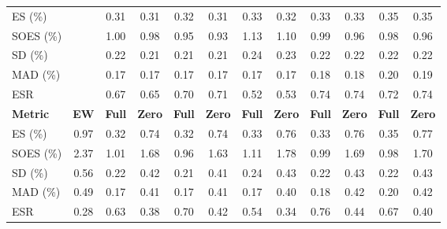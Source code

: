 \begin{tabular}{l*{11}{c}}
    \midrule
    ES (\%) &  & 0.31 & 0.31 & 0.32 & 0.31 & 0.33 & 0.32 & 0.33 & 0.33 & 0.35 & 0.35 \\
    SOES (\%) &  & 1.00 & 0.98 & 0.95 & 0.93 & 1.13 & 1.10 & 0.99 & 0.96 & 0.98 & 0.96 \\
    SD (\%) &  & 0.22 & 0.21 & 0.21 & 0.21 & 0.24 & 0.23 & 0.22 & 0.22 & 0.22 & 0.22 \\
    MAD (\%) &  & 0.17 & 0.17 & 0.17 & 0.17 & 0.17 & 0.17 & 0.18 & 0.18 & 0.20 & 0.19 \\
    ESR &  & 0.67 & 0.65 & 0.70 & 0.71 & 0.52 & 0.53 & 0.74 & 0.74 & 0.72 & 0.74 \\
    \midrule
    \textbf{Metric} & \textbf{EW} & \textbf{Full} & \textbf{Zero} & \textbf{Full} & \textbf{Zero} & \textbf{Full} & \textbf{Zero} & \textbf{Full} & \textbf{Zero} & \textbf{Full} & \textbf{Zero} \\
    \midrule
    ES (\%) & 0.97 & 0.32 & 0.74 & 0.32 & 0.74 & 0.33 & 0.76 & 0.33 & 0.76 & 0.35 & 0.77 \\
    SOES (\%) & 2.37 & 1.01 & 1.68 & 0.96 & 1.63 & 1.11 & 1.78 & 0.99 & 1.69 & 0.98 & 1.70 \\
    SD (\%) & 0.56 & 0.22 & 0.42 & 0.21 & 0.41 & 0.24 & 0.43 & 0.22 & 0.43 & 0.22 & 0.43 \\
    MAD (\%) & 0.49 & 0.17 & 0.41 & 0.17 & 0.41 & 0.17 & 0.40 & 0.18 & 0.42 & 0.20 & 0.42 \\
    ESR & 0.28 & 0.63 & 0.38 & 0.70 & 0.42 & 0.54 & 0.34 & 0.76 & 0.44 & 0.67 & 0.40 \\
    \bottomrule
  \end{tabular}
